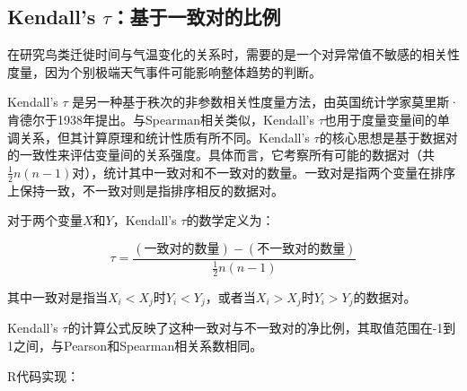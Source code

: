 \documentclass[
  twoside,12pt,fontset=none]{ctexbook}
\begin{document}
\hypertarget{kendalls-tauux57faux4e8eux4e00ux81f4ux5bf9ux7684ux6bd4ux4f8b}{%
\subsection{\texorpdfstring{Kendall's \(\tau\)：基于一致对的比例}{Kendall's \textbackslash tau：基于一致对的比例}}\label{kendalls-tauux57faux4e8eux4e00ux81f4ux5bf9ux7684ux6bd4ux4f8b}}

在研究鸟类迁徙时间与气温变化的关系时，需要的是一个对异常值不敏感的相关性度量，因为个别极端天气事件可能影响整体趋势的判断。

Kendall's \(\tau\) 是另一种基于秩次的非参数相关性度量方法，由英国统计学家莫里斯·肯德尔于1938年提出。与Spearman相关类似，Kendall's \(\tau\)也用于度量变量间的单调关系，但其计算原理和统计性质有所不同。Kendall's \(\tau\)的核心思想是基于数据对的一致性来评估变量间的关系强度。具体而言，它考察所有可能的数据对（共\(\frac{1}{2}n(n-1)\)对），统计其中一致对和不一致对的数量。一致对是指两个变量在排序上保持一致，不一致对则是指排序相反的数据对。

对于两个变量\(X\)和\(Y\)，Kendall's \(\tau\)的数学定义为：

\[\tau = \frac{(\text{一致对的数量}) - (\text{不一致对的数量})}{\frac{1}{2}n(n-1)}\]

其中一致对是指当\(X_i < X_j\)时\(Y_i < Y_j\)，或者当\(X_i > X_j\)时\(Y_i > Y_j\)的数据对。

Kendall's \(\tau\)的计算公式反映了这种一致对与不一致对的净比例，其取值范围在-1到1之间，与Pearson和Spearman相关系数相同。

R代码实现：
\end{document}
